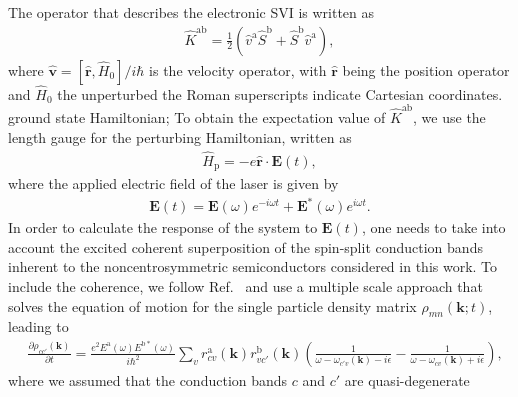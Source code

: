\documentclass[floatfix,prb,aps,superscriptaddress,showpacs,11pt,preprint,letterpaper]{revtex4}
\begin{document}
The operator that describes the electronic SVI is written as
\begin{align}\label{z.1}
\hat K^{\mathrm{a}\mathrm{b}} = 
\frac{1}{2}\left( \hat v^\mathrm{a} \hat S^\mathrm{b} 
+\hat  S^\mathrm{b} \hat v^\mathrm{a}\right) 
,
\end{align} 
where $\hat{\mathbf v}=[\hat{\mathbf r},\hat H_0]/i\hbar$ 
is the velocity operator, with
$\hat {\mathbf r}$ 
being the position operator and $\hat H_0$ the unperturbed
the Roman superscripts  indicate Cartesian coordinates. 
ground state Hamiltonian;
To obtain the expectation value of 
$\hat K^{\mathrm{a}\mathrm{b}}$, we use the length gauge for the perturbing
Hamiltonian, written as
\begin{align}\label{z.2}
\hat H_{\text{p}}=-e\hat{\mathbf r}\cdot{\mathbf E}(t)
,
\end{align}   
where the applied electric field of the laser is given by
\begin{align}\label{z.3}
{\mathbf E}(t) = 
{\mathbf E}(\omega)e^{-i\omega t} + {\mathbf E}^*(\omega)e^{i\omega t}
.
\end{align}
In order to calculate the response of the system to ${\mathbf E}(t)$, one needs
to take into account the excited coherent superposition of the spin-split
conduction bands inherent to the noncentrosymmetric semiconductors considered
in this work.
To include the coherence, we follow Ref.~ and
use a multiple
scale approach that solves the equation of motion for the single
particle density matrix ${\rho}_{mn}({\mathbf k};t)$, leading to
\begin{align}\label{z.4}
&\frac{\partial \rho_{cc'}({\mathbf k})}{\partial t} =
\frac{e^{2}E^{\mathrm{a}}(\omega)E^{\mathrm{b*}}(\omega)}
{i \hbar^{2}}
\sum_{v}r^{\mathrm{a}}_{cv}({\mathbf k}) r^{\mathrm{b}}_{vc'}({\mathbf k})
\left( \frac{1}{\omega - \omega_{c'v}({\mathbf k}) - i \epsilon} 
- 
\frac{1}{\omega - \omega_{cv}({\mathbf k}) + i \epsilon} \right)
,
\end{align}
where we assumed that the conduction bands $c$ and $c'$ are quasi-degenerate
\end{document}
